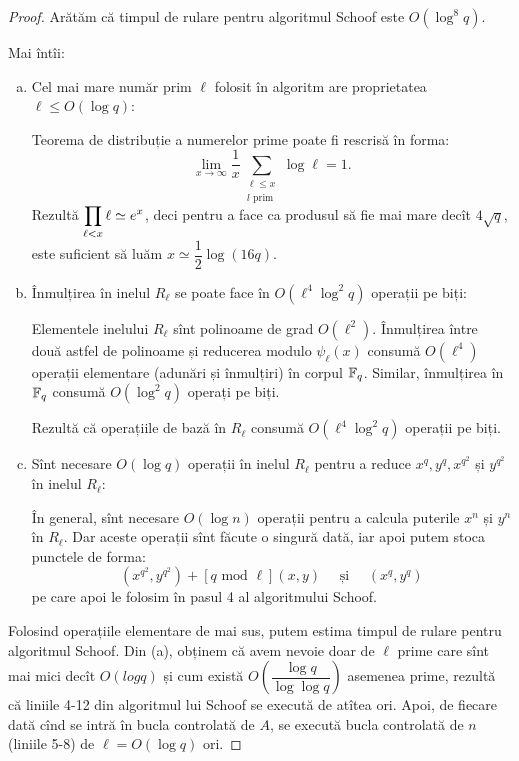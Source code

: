 \begin{proof}
    Arătăm că timpul de rulare pentru algoritmul Schoof este $ O(\log^8 q) $.

    Mai întîi:
    \begin{enumerate}[(a)]
        \item Cel mai mare număr prim $ \ell $ folosit în algoritm are
            proprietatea $ \ell \leq O(\log q) $:

            Teorema de distribuție a numerelor prime poate fi rescrisă în forma:
            \[
                \lim_{x \to \infty} \dfrac{1}{x} %
                \sum_{\substack{\ell \leq x \\ l\text{ prim }}} \log \ell = 1.
            \]
            Rezultă $ \displaystyle\prod_{\ell < x} \ell \simeq e^x $, deci pentru a face
            ca produsul să fie mai mare decît $ 4 \sqrt{q} $, este suficient
            să luăm $ x \simeq \dfrac{1}{2} \log(16 q) $.
        \item Înmulțirea în inelul $ R_\ell $ se poate face în $ O(\ell^4 \log^2 q) $ operații
            pe biți:

            Elementele inelului $ R_\ell $ sînt polinoame de grad $ O(\ell^2) $.
            Înmulțirea între două astfel de polinoame și reducerea modulo
            $ \psi_\ell(x) $ consumă $ O(\ell^4) $ operații elementare
            (adunări și înmulțiri) în corpul $ \mathbb{F}_q $. Similar, înmulțirea
            în $ \mathbb{F}_q $ consumă $ O(\log^2 q) $ operați pe biți.

            Rezultă că operațiile de bază în $ R_\ell $ consumă $ O(\ell^4 \log^2 q) $
            operații pe biți.

        \item Sînt necesare $ O(\log q) $ operații în inelul $ R_\ell $ pentru
            a reduce $ x^q, y^q, x^{q^2} $ și $ y^{q^2} $ în inelul $ R_\ell $:


            În general, sînt necesare $ O(\log n) $ operații pentru a
            calcula puterile $ x^n $ și $ y^n $ în $ R_\ell $.
            Dar aceste operații sînt făcute o singură dată, iar apoi putem stoca
            punctele de forma:
            \[
                (x^{q^2}, y^{q^2}) + [q \text{ mod } \ell] (x, y) \quad \text{ și } \quad (x^q, y^q)
            \]
            pe care apoi le folosim în pasul 4 al algoritmului Schoof.
    \end{enumerate}

    Folosind operațiile elementare de mai sus, putem estima timpul de rulare pentru
    algoritmul Schoof. Din (a), obținem că avem nevoie doar de $ \ell $ prime care sînt
    mai mici decît $ O(log q) $ și cum există $ O\left( \dfrac{\log q}{\log \log q} \right) $
    asemenea prime, rezultă că liniile 4-12 din algoritmul lui Schoof
    se execută de atîtea ori. Apoi, de fiecare dată cînd se intră în bucla
    controlată de $ A $, se execută bucla controlată de $ n $ (liniile
    5-8) de $ \ell = O(\log q) $ ori.


\end{proof}
